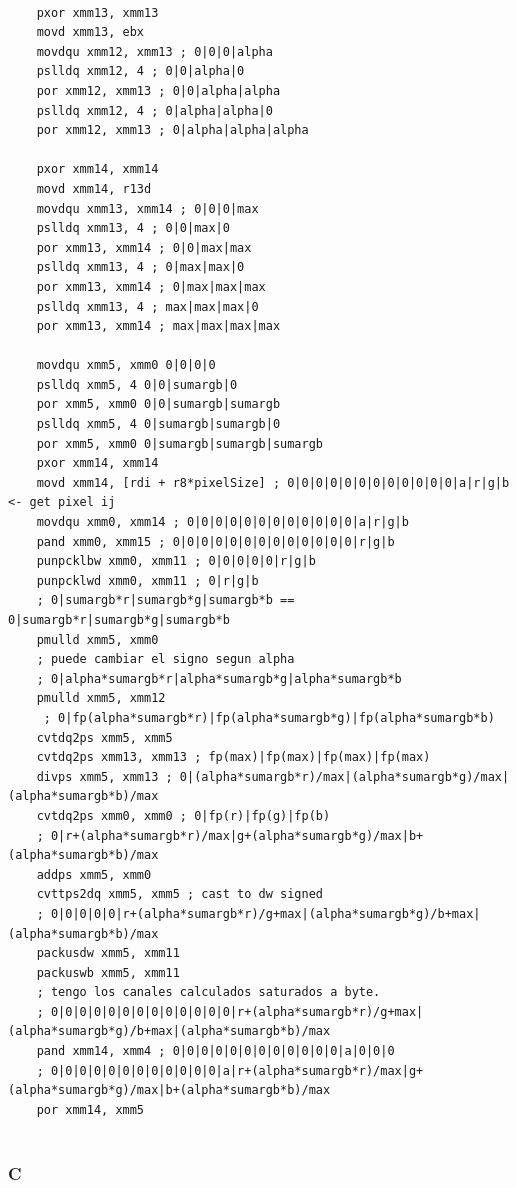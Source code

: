 \begin{codesnippet}
\begin{verbatim}
    
    pxor xmm13, xmm13
    movd xmm13, ebx
    movdqu xmm12, xmm13 ; 0|0|0|alpha
    pslldq xmm12, 4 ; 0|0|alpha|0
    por xmm12, xmm13 ; 0|0|alpha|alpha
    pslldq xmm12, 4 ; 0|alpha|alpha|0
    por xmm12, xmm13 ; 0|alpha|alpha|alpha

    pxor xmm14, xmm14
    movd xmm14, r13d
    movdqu xmm13, xmm14 ; 0|0|0|max
    pslldq xmm13, 4 ; 0|0|max|0
    por xmm13, xmm14 ; 0|0|max|max
    pslldq xmm13, 4 ; 0|max|max|0
    por xmm13, xmm14 ; 0|max|max|max
    pslldq xmm13, 4 ; max|max|max|0
    por xmm13, xmm14 ; max|max|max|max

    movdqu xmm5, xmm0 0|0|0|0
    pslldq xmm5, 4 0|0|sumargb|0
    por xmm5, xmm0 0|0|sumargb|sumargb
    pslldq xmm5, 4 0|sumargb|sumargb|0
    por xmm5, xmm0 0|sumargb|sumargb|sumargb
    pxor xmm14, xmm14
    movd xmm14, [rdi + r8*pixelSize] ; 0|0|0|0|0|0|0|0|0|0|0|0|a|r|g|b <- get pixel ij
    movdqu xmm0, xmm14 ; 0|0|0|0|0|0|0|0|0|0|0|0|a|r|g|b
    pand xmm0, xmm15 ; 0|0|0|0|0|0|0|0|0|0|0|0|0|r|g|b
    punpcklbw xmm0, xmm11 ; 0|0|0|0|0|r|g|b
    punpcklwd xmm0, xmm11 ; 0|r|g|b
    ; 0|sumargb*r|sumargb*g|sumargb*b == 0|sumargb*r|sumargb*g|sumargb*b
    pmulld xmm5, xmm0 
    ; puede cambiar el signo segun alpha
    ; 0|alpha*sumargb*r|alpha*sumargb*g|alpha*sumargb*b 
    pmulld xmm5, xmm12 
     ; 0|fp(alpha*sumargb*r)|fp(alpha*sumargb*g)|fp(alpha*sumargb*b)
    cvtdq2ps xmm5, xmm5
    cvtdq2ps xmm13, xmm13 ; fp(max)|fp(max)|fp(max)|fp(max)
    divps xmm5, xmm13 ; 0|(alpha*sumargb*r)/max|(alpha*sumargb*g)/max|(alpha*sumargb*b)/max
    cvtdq2ps xmm0, xmm0 ; 0|fp(r)|fp(g)|fp(b)
    ; 0|r+(alpha*sumargb*r)/max|g+(alpha*sumargb*g)/max|b+(alpha*sumargb*b)/max
    addps xmm5, xmm0 
    cvttps2dq xmm5, xmm5 ; cast to dw signed 
    ; 0|0|0|0|0|r+(alpha*sumargb*r)/g+max|(alpha*sumargb*g)/b+max|(alpha*sumargb*b)/max
    packusdw xmm5, xmm11 
    packuswb xmm5, xmm11 
    ; tengo los canales calculados saturados a byte.
    ; 0|0|0|0|0|0|0|0|0|0|0|0|0|r+(alpha*sumargb*r)/g+max|(alpha*sumargb*g)/b+max|(alpha*sumargb*b)/max 
    pand xmm14, xmm4 ; 0|0|0|0|0|0|0|0|0|0|0|0|a|0|0|0
    ; 0|0|0|0|0|0|0|0|0|0|0|0|a|r+(alpha*sumargb*r)/max|g+(alpha*sumargb*g)/max|b+(alpha*sumargb*b)/max
    por xmm14, xmm5 
    
\end{verbatim}
\end{codesnippet}

\subsubsection{C}

